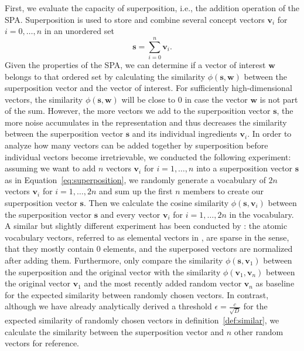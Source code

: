 First, we evaluate the capacity of superposition, i.e., the addition operation of the \ac{SPA}.
Superposition is used to store and combine several concept vectors $ \mathbf{v}_i$ for $i=0, \ldots, n$ in an unordered set
\begin{equation}
\label{eq:superposition}
\mathbf{s} = \sum\limits_{i=0}^{n} \mathbf{v}_{i}.
\end{equation}
Given the properties of the \ac{SPA}, we can determine if a vector of interest $\mathbf{w}$ belongs to that ordered set by calculating the similarity $\phi\left( \mathbf{s}, \mathbf{w}\right)$ between the superposition vector and the vector of interest.
For sufficiently high-dimensional vectors, the similarity $\phi\left( \mathbf{s}, \mathbf{w}\right)$ will be close to \num{0} in case the vector $ \mathbf{w}$ is not part of the sum.
However, the more vectors we add to the superposition vector $ \mathbf{s}$, the more noise accumulates in the representation and thus decreases the similarity between the superposition vector $ \mathbf{s}$ and its individual ingredients $ \mathbf{v}_i$.
In order to analyze how many vectors can be added together by superposition before individual vectors become irretrievable, we conducted the following experiment: assuming we want to add $n$ vectors $ \mathbf{v}_i$ for $i=1, \ldots, n$ into a superposition vector $ \mathbf{s}$ as in Equation~\eqref{eq:superposition}, we randomly generate a vocabulary of $2n$ vectors $ \mathbf{v}_i$ for $i=1, \ldots, 2n$ and sum up the first $n$ members to create our superposition vector $ \mathbf{s}$.
Then we calculate the cosine similarity $\phi\left(\mathbf{s}, \mathbf{v}_i\right)$ between the superposition vector $ \mathbf{s}$ and every vector $ \mathbf{v}_{i}$ for $i=1,\ldots, 2n$ in the vocabulary.
A similar but slightly different experiment has been conducted by \textcite{Wahle2012}: the atomic vocabulary vectors,  referred to as elemental vectors in \textcite{Wahle2012}, are sparse in the sense, that they mostly contain \num{0} elements, and the superposed vectors are normalized after adding them.
Furthermore, \textcite{Wahle2012} only compare the similarity $\phi\left(\mathbf{s}, \mathbf{v}_1\right)$ between the superposition and the original vector with the similarity $\phi\left(\mathbf{v}_1, \mathbf{v}_n\right)$ between the original vector $ \mathbf{v}_1$ and the most recently added random vector $ \mathbf{v}_{n}$ as baseline for the expected similarity between randomly chosen vectors.
In contrast, although we have already analytically derived a threshold $\epsilon= \tfrac{c}{\sqrt{D}}$ for the expected similarity of randomly chosen vectors in definition~\ref{def:similar}, we calculate the similarity between the superposition vector and $n$ other random vectors for reference.

